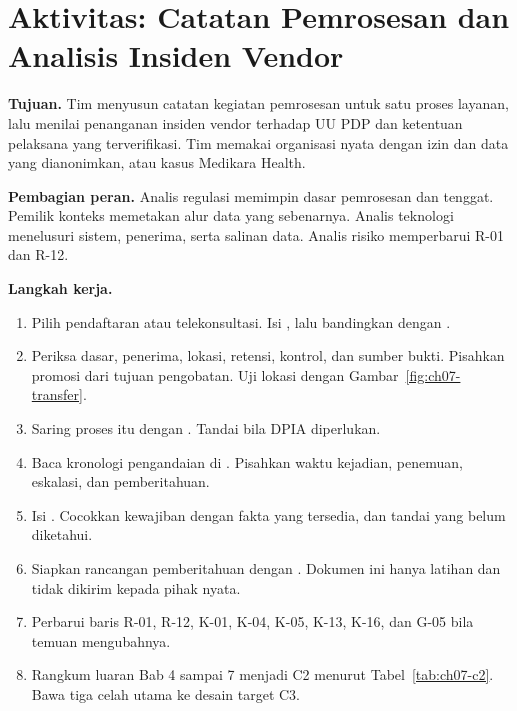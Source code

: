 \section{Aktivitas: Catatan Pemrosesan dan Analisis Insiden Vendor}

\textbf{Tujuan.} Tim menyusun catatan kegiatan pemrosesan untuk satu proses layanan, lalu menilai
penanganan insiden vendor terhadap UU PDP dan ketentuan pelaksana yang terverifikasi. Tim memakai
organisasi nyata dengan izin dan data yang dianonimkan, atau kasus Medikara Health.

\textbf{Pembagian peran.} Analis regulasi memimpin dasar pemrosesan dan tenggat. Pemilik konteks
memetakan alur data yang sebenarnya. Analis teknologi menelusuri sistem, penerima, serta salinan
data. Analis risiko memperbarui R-01 dan R-12.

\textbf{Langkah kerja.}
\begin{enumerate}
  \item Pilih pendaftaran atau telekonsultasi. Isi
  , lalu bandingkan dengan
  .
  \item Periksa dasar, penerima, lokasi, retensi, kontrol, dan sumber bukti. Pisahkan promosi dari
  tujuan pengobatan. Uji lokasi dengan Gambar~\ref{fig:ch07-transfer}.
  \item Saring proses itu dengan . Tandai
  bila DPIA diperlukan.
  \item Baca kronologi pengandaian di .
  Pisahkan waktu kejadian, penemuan, eskalasi, dan pemberitahuan.
  \item Isi . Cocokkan kewajiban dengan fakta yang
  tersedia, dan tandai yang belum diketahui.
  \item Siapkan rancangan pemberitahuan dengan .
  Dokumen ini hanya latihan dan tidak dikirim kepada pihak nyata.
  \item Perbarui baris R-01, R-12, K-01, K-04, K-05, K-13, K-16, dan G-05 bila temuan mengubahnya.
  \item Rangkum luaran Bab 4 sampai 7 menjadi C2 menurut Tabel~\ref{tab:ch07-c2}. Bawa tiga celah
  utama ke desain target C3.
\end{enumerate}

